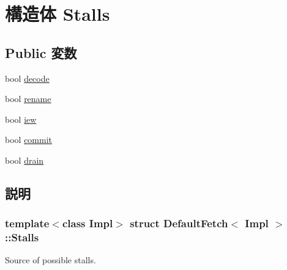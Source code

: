 \hypertarget{structDefaultFetch_1_1Stalls}{
\section{構造体 Stalls}
\label{structDefaultFetch_1_1Stalls}
}
\subsection*{Public 変数}
\begin{DoxyCompactItemize}
\item 
bool \hyperlink{structDefaultFetch_1_1Stalls_a8bd8acc41e5baa0bb18c0f0f6a78020e}{decode}
\item 
bool \hyperlink{structDefaultFetch_1_1Stalls_a5e8e124987c56967514ad546a9f9c09b}{rename}
\item 
bool \hyperlink{structDefaultFetch_1_1Stalls_a69f40ab12e9825ce316dfa72651a7404}{iew}
\item 
bool \hyperlink{structDefaultFetch_1_1Stalls_ad7d6b839c43385b5fffdf2beaff214ec}{commit}
\item 
bool \hyperlink{structDefaultFetch_1_1Stalls_af29f0db645517864849f52e686f40bf6}{drain}
\end{DoxyCompactItemize}


\subsection{説明}
\subsubsection*{template$<$class Impl$>$ struct DefaultFetch$<$ Impl $>$::Stalls}

Source of possible stalls. 

